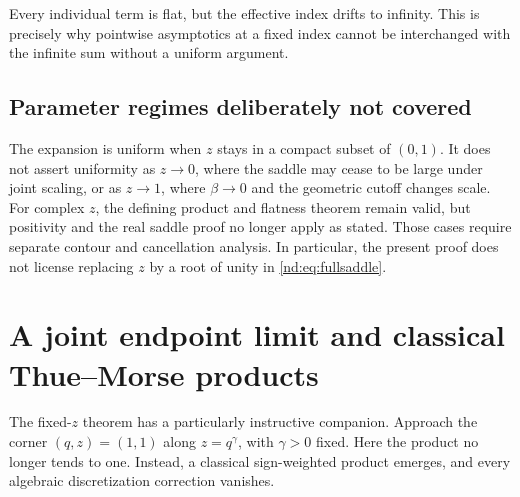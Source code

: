 \documentclass[11pt,a4paper,oneside,openany]{book}
\numberwithin{equation}{chapter}
\theoremstyle{definition}
\theoremstyle{remark}
\begin{document}
Every individual term is flat, but the effective index drifts to infinity.
This is precisely why pointwise asymptotics at a fixed index cannot be
interchanged with the infinite sum without a uniform argument.

\section{Parameter regimes deliberately not covered}
The expansion is uniform when \(z\) stays in a compact subset of \((0,1)\).
It does not assert uniformity as \(z\to0\), where the saddle may cease to be
large under joint scaling, or as \(z\to1\), where \(\beta\to0\) and the
geometric cutoff changes scale. For complex \(z\), the defining product and
flatness theorem remain valid, but positivity and the real saddle proof no
longer apply as stated. Those cases require separate contour and cancellation
analysis. In particular, the present proof does not license replacing \(z\)
by a root of unity in \eqref{nd:eq:fullsaddle}.
\chapter{A joint endpoint limit and classical Thue--Morse products}
\label{nd:sec:boundarylayer}

The fixed-\(z\) theorem has a particularly instructive companion. Approach
the corner \((q,z)=(1,1)\) along \(z=q^\gamma\), with \(\gamma>0\) fixed.
Here the product no longer tends to one. Instead, a classical sign-weighted
product emerges, and every algebraic discretization correction vanishes.
\end{document}
